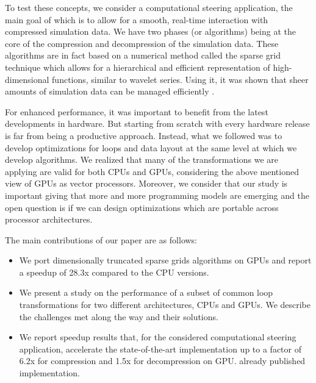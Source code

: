 To test these concepts, we consider a computational steering application, the
main goal of which is to allow for a smooth, real-time interaction with
compressed simulation data. We have two phases (or algorithms) being at the core
of the compression and decompression of the simulation data. These algorithms
are in fact based on a numerical method called the sparse grid technique which
allows for a hierarchical and efficient representation of high-dimensional
functions, similar to wavelet series. Using it, it was shown that sheer amounts
of simulation data can be managed efficiently \cite{Butnaru201156}.

For enhanced performance, it was important to benefit from the latest
developments in hardware. But starting from scratch with every hardware release
is far from being a productive approach. Instead, what we followed was to
develop optimizations for loops and data layout at the same level at which we
develop algorithms. We realized that many of the transformations we are applying
are valid for both CPUs and GPUs, considering the above mentioned view of GPUs
as vector processors. Moreover, we consider that our study is important giving
that more and more programming models are emerging and the open question is if
we can design optimizations which are portable across processor architectures.

The main contributions of our paper are as follows:

\begin{itemize}
  \item We port dimensionally truncated sparse grids algorithms on GPUs and
  report a speedup of 28.3x compared to the CPU versions.
  \item We present a study on the performance of a subset of common loop
  transformations for two different architectures, CPUs and GPUs. We describe
  the challenges met along the way and their solutions.
  \item We report speedup results that, for the considered computational
  steering application, accelerate the state-of-the-art implementation up to a
  factor of 6.2x for compression and 1.5x for decompression on GPU. 
  already published implementation.
\end{itemize}

